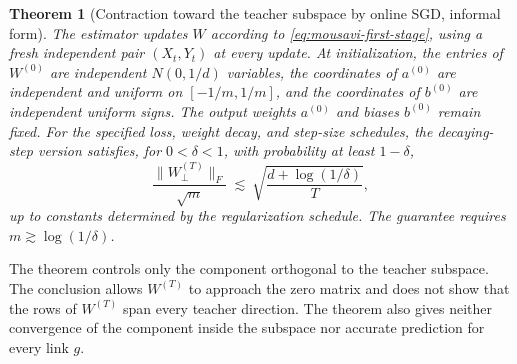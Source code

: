 \documentclass[11pt,twoside]{article}
\newtheorem{theorem}{Theorem}[section]
\theoremstyle{definition}
\theoremstyle{remark}
\begin{document}
\begin{theorem}[Contraction toward the teacher subspace by online SGD, informal form]
The estimator updates \(W\) according to
\cref{eq:mousavi-first-stage}, using a fresh independent pair
\((X_t,Y_t)\) at every update. At initialization, the entries of \(W^{(0)}\)
are independent \(N(0,1/d)\) variables, the coordinates of \(a^{(0)}\) are
independent and uniform on \([-1/m,1/m]\), and the coordinates of \(b^{(0)}\)
are independent uniform signs. The output weights \(a^{(0)}\) and biases
\(b^{(0)}\) remain fixed. For the specified loss, weight decay, and step-size
schedules, the decaying-step version satisfies, for \(0<\delta<1\), with
probability at least \(1-\delta\),
\begin{equation}
 \frac{\|W^{(T)}_\perp\|_F}{\sqrt m}
 \ \lesssim\
 \sqrt{\frac{d+\log(1/\delta)}{T}},
 \label{eq:sgd-subspace-rate}
\end{equation}
up to constants determined by the regularization schedule. The guarantee
requires \(m\gtrsim\log(1/\delta)\).
\end{theorem}

The theorem controls only the component orthogonal to the teacher subspace.
The conclusion allows \(W^{(T)}\) to approach the zero matrix and does not
show that the rows of \(W^{(T)}\) span every teacher direction. The theorem
also gives neither convergence of the component inside the subspace nor
accurate prediction for every link \(g\).
\end{document}
